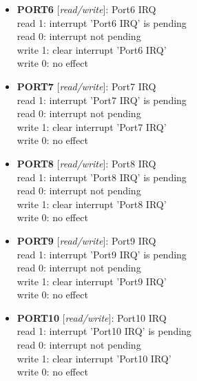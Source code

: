 \begin{itemize}
\begin{small}
{\bf 
PORT5
} [\emph{read/write}]: Port5 IRQ
\\
read 1: interrupt 'Port5 IRQ' is pending\\read 0: interrupt not pending\\write 1: clear interrupt 'Port5 IRQ'\\write 0: no effect
\end{small}
\item \begin{small}
{\bf 
PORT6
} [\emph{read/write}]: Port6 IRQ
\\
read 1: interrupt 'Port6 IRQ' is pending\\read 0: interrupt not pending\\write 1: clear interrupt 'Port6 IRQ'\\write 0: no effect
\end{small}
\item \begin{small}
{\bf 
PORT7
} [\emph{read/write}]: Port7 IRQ
\\
read 1: interrupt 'Port7 IRQ' is pending\\read 0: interrupt not pending\\write 1: clear interrupt 'Port7 IRQ'\\write 0: no effect
\end{small}
\item \begin{small}
{\bf 
PORT8
} [\emph{read/write}]: Port8 IRQ
\\
read 1: interrupt 'Port8 IRQ' is pending\\read 0: interrupt not pending\\write 1: clear interrupt 'Port8 IRQ'\\write 0: no effect
\end{small}
\item \begin{small}
{\bf 
PORT9
} [\emph{read/write}]: Port9 IRQ
\\
read 1: interrupt 'Port9 IRQ' is pending\\read 0: interrupt not pending\\write 1: clear interrupt 'Port9 IRQ'\\write 0: no effect
\end{small}
\item \begin{small}
{\bf 
PORT10
} [\emph{read/write}]: Port10 IRQ
\\
read 1: interrupt 'Port10 IRQ' is pending\\read 0: interrupt not pending\\write 1: clear interrupt 'Port10 IRQ'\\write 0: no effect

\end{small}
\end{itemize}
